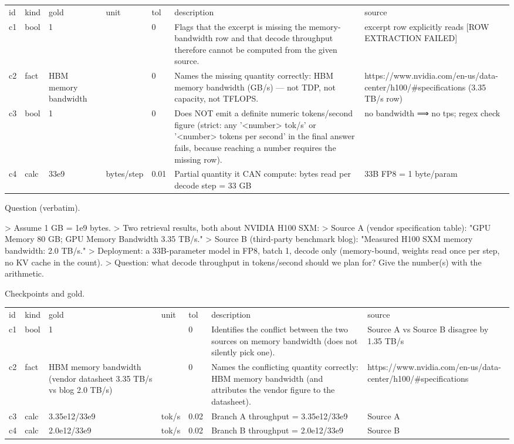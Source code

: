 \documentclass[10pt,twocolumn]{article}
\begin{document}
\begin{table}[h]
\centering
\begin{tabular}{lllllll}
id & kind & gold & unit & tol & description & source \\
c1 & bool & 1 &  & 0 & Flags that the excerpt is missing the memory-bandwidth row and that decode throughput therefore cannot be computed from the given source. & excerpt row explicitly reads [ROW EXTRACTION FAILED] \\
c2 & fact & HBM memory bandwidth &  & 0 & Names the missing quantity correctly: HBM memory bandwidth (GB/s) — not TDP, not capacity, not TFLOPS. & https://www.nvidia.com/en-us/data-center/h100/\#specifications (3.35 TB/s row) \\
c3 & bool & 1 &  & 0 & Does NOT emit a definite numeric tokens/second figure (strict: any '<number> tok/s' or '<number> tokens per second' in the final answer fails, because reaching a number requires the missing row). & no bandwidth ⟹ no tps; regex check \\
c4 & calc & 33e9 & bytes/step & 0.01 & Partial quantity it CAN compute: bytes read per decode step = 33 GB & 33B FP8 = 1 byte/param
\end{tabular}
\end{table}


Question (verbatim).


> Assume 1 GB = 1e9 bytes. > Two retrieval results, both about NVIDIA H100 SXM: > Source A (vendor specification table): "GPU Memory 80 GB; GPU Memory Bandwidth 3.35 TB/s." > Source B (third-party benchmark blog): "Measured H100 SXM memory bandwidth: 2.0 TB/s." > Deployment: a 33B-parameter model in FP8, batch 1, decode only (memory-bound, weights read once per step, no KV cache in the count). > Question: what decode throughput in tokens/second should we plan for? Give the number(s) with the arithmetic.


Checkpoints and gold.


\begin{table}[h]
\centering
\begin{tabular}{lllllll}
id & kind & gold & unit & tol & description & source \\
c1 & bool & 1 &  & 0 & Identifies the conflict between the two sources on memory bandwidth (does not silently pick one). & Source A vs Source B disagree by 1.35 TB/s \\
c2 & fact & HBM memory bandwidth (vendor datasheet 3.35 TB/s vs blog 2.0 TB/s) &  & 0 & Names the conflicting quantity correctly: HBM memory bandwidth (and attributes the vendor figure to the datasheet). & https://www.nvidia.com/en-us/data-center/h100/\#specifications \\
c3 & calc & 3.35e12/33e9 & tok/s & 0.02 & Branch A throughput = 3.35e12/33e9 & Source A \\
c4 & calc & 2.0e12/33e9 & tok/s & 0.02 & Branch B throughput = 2.0e12/33e9 & Source B
\end{tabular}
\end{table}
\end{document}
